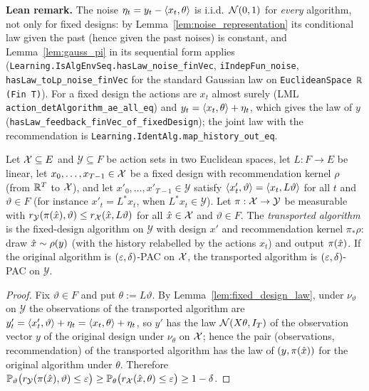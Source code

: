 \textbf{Lean remark.} The noise $\eta_t = y_t - \langle x_t, \theta \rangle$ is i.i.d.\ $\mathcal{N}(0,1)$ for
\emph{every} algorithm, not only for fixed designs: by Lemma~\ref{lem:noise_representation} its
conditional law given the past (hence given the past noises) is constant, and
Lemma~\ref{lem:gauss_pi} in its sequential form applies
(\texttt{Learning.IsAlgEnvSeq.hasLaw\_noise\_finVec}, \texttt{iIndepFun\_noise},
\texttt{hasLaw\_toLp\_noise\_finVec} for the standard Gaussian law on
\texttt{EuclideanSpace ℝ (Fin T)}). For a fixed design the actions are $x_t$ almost surely
(LML \texttt{action\_detAlgorithm\_ae\_all\_eq}) and $y_t = \langle x_t, \theta \rangle + \eta_t$, which
gives the law of $y$ (\texttt{hasLaw\_feedback\_finVec\_of\_fixedDesign}); the joint law with
the recommendation is \texttt{Learning.IdentAlg.map\_history\_out\_eq}.

\begin{lemma}\label{lem:fixed_design_transport}
\leanok
{}
Let $\mathcal{X} \subseteq E$ and $\mathcal Y \subseteq F$ be action sets in two Euclidean spaces, let
$L : F \to E$ be linear, let $x_0, \dots, x_{T-1} \in \mathcal{X}$ be a fixed design with
recommendation kernel $\rho$ (from $\mathbb{R}^T$ to $\mathcal{X}$), and let $x'_0, \dots, x'_{T-1} \in
\mathcal Y$ satisfy $\langle x'_t, \vartheta \rangle = \langle x_t, L\vartheta \rangle$ for all $t$ and
$\vartheta \in F$ (for instance $x'_t = L^*x_t$, when $L^*x_t \in \mathcal Y$). Let
$\pi : \mathcal{X} \to \mathcal Y$ be measurable with
$r_{\mathcal Y}(\pi(\hat{x}), \vartheta) \le r_{\mathcal{X}}(\hat{x}, L\vartheta)$ for all $\hat{x} \in \mathcal{X}$ and
$\vartheta \in F$. The \emph{transported algorithm} is the fixed-design algorithm on
$\mathcal Y$ with design $x'$ and recommendation kernel $\pi_*\rho$: draw $\hat{x} \sim \rho(y)$
(with the history relabelled by the actions $x_t$) and output $\pi(\hat{x})$. If the original
algorithm is $(\varepsilon,\delta)$-PAC on $\mathcal{X}$, the transported algorithm is $(\varepsilon,\delta)$-PAC on
$\mathcal Y$.
\end{lemma}

\begin{proof}
\leanok
{}
Fix $\vartheta \in F$ and put $\theta := L\vartheta$. By Lemma~\ref{lem:fixed_design_law},
under $\nu_\vartheta$ on $\mathcal Y$ the observations of the transported algorithm are
$y'_t = \langle x'_t, \vartheta \rangle + \eta_t = \langle x_t, \theta \rangle + \eta_t$, so $y'$ has the law
$\mathcal{N}(X\theta, I_T)$ of the observation vector $y$ of the original design under
$\nu_\theta$ on $\mathcal{X}$; hence the pair (observations, recommendation) of the transported
algorithm has the law of $(y, \pi(\hat{x}))$ for the original algorithm under $\theta$. Therefore
$\mathbb{P}_\vartheta\big(r_{\mathcal Y}(\pi(\hat{x}),\vartheta) \le \varepsilon\big)
\ge \mathbb{P}_\theta\big(r_{\mathcal{X}}(\hat{x},\theta) \le \varepsilon\big) \ge 1 - \delta$.
\end{proof}


